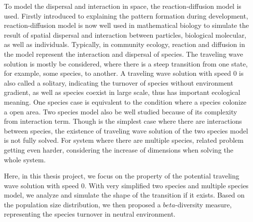     To model the dispersal and interaction in space, the reaction-diffusion model is used. Firstly introduced to explaining the pattern formation during development, reaction-diffusion model is now well used in mathematical biology to simulate the result of spatial dispersal and interaction between particles, biological molecular, as well as individuals. Typically, in community ecology, reaction and diffusion in the model represent the interaction and dispersal of species. The traveling wave solution is mostly be considered, where there is a steep transition from one state, for example, some species, to another. A traveling wave solution with speed $0$ is also called a solitary, indicating the turnover of species without environment gradient, as well as species coexist in large scale, thus has important ecological meaning. One species case is equivalent to the condition where a species colonize a open area. Two species model also be well studied because of its complexity from interaction term. Though is the simplest case where there are interactions between species, the existence of traveling wave solution of the two species model is not fully solved. For system where there are multiple species, related problem getting even harder, considering the increase of dimensions when solving the whole system.

    Here, in this thesis project, we focus on the property of the potential traveling wave solution with speed $0$. With very simplified two species and multiple species model, we analyze and simulate the shape of the transition if it exists. Based on the population size distribution, we then proposed a $beta$-diversity measure, representing the species turnover in neutral environment.
